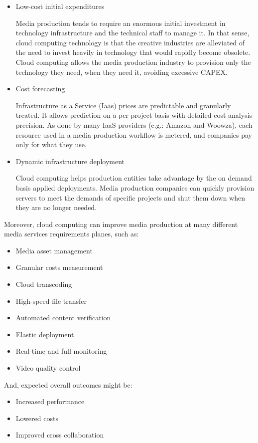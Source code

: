 \begin{itemize}
\item Low-cost initial expenditures \hfill 

Media production tends to require an enormous initial investment in technology infrastructure and the technical staff to manage it. In that sense, cloud computing technology is that the creative industries are alleviated of the need to invest heavily in technology that would rapidly become obsolete. Cloud computing allows the media production industry to provision only the technology they need, when they need it, avoiding excessive CAPEX.

\item Cost forecasting\hfill 

Infrastructure as a Service (Iaas) prices are predictable and granularly treated. It allows prediction on a per project basis with detailed cost analysis precision. As done by many IaaS providers (e.g.: Amazon and Woowza), each resource used in a media production workflow is metered, and companies pay only for what they use.

\item Dynamic infrastructure deployment \hfill 

Cloud computing helps production entities take advantage by the on demand basis applied deployments. Media production companies can quickly provision servers to meet the demands of specific projects and shut them down when they are no longer needed.
\end{itemize}

Moreover, cloud computing can improve media production at many different media services requirements planes, such as:

\begin{itemize}
\item Media asset management
\item Granular costs measurement
\item Cloud transcoding
\item High-speed file transfer
\item Automated content verification
\item Elastic deployment
\item Real-time and full monitoring
\item Video quality control
\end{itemize}

And, expected overall outcomes might be:

\begin{itemize}
\item Increased performance
\item Lowered costs
\item Improved cross collaboration
\end{itemize}


